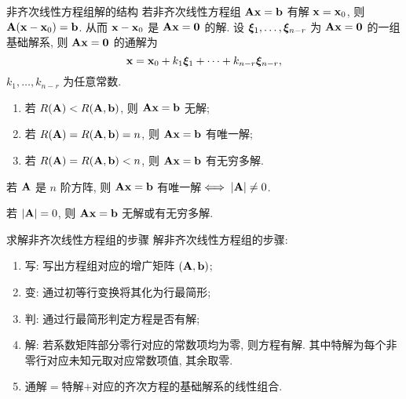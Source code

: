 \begin{frame}{非齐次线性方程组解的结构}
	\onslide<+->
	若非齐次线性方程组 ${\mathbf{A}}{\mathbf{x}}={\mathbf{b}}$ 有解 ${\mathbf{x}}={\mathbf{x}}_0$,
	则 ${\mathbf{A}}({\mathbf{x}}-{\mathbf{x}}_0)={\mathbf{b}}$.
	\onslide<+->
	从而 ${\mathbf{x}}-{\mathbf{x}}_0$ 是 ${\mathbf{A}}{\mathbf{x}}={\bf0}$ 的解.
	\onslide<+->
	设 ${\boldsymbol{\xi}}_1,\dots,{\boldsymbol{\xi}}_{n-r}$ 为 ${\mathbf{A}}{\mathbf{x}}={\bf0}$ 的一组基础解系, 则 ${\mathbf{A}}{\mathbf{x}}={\bf0}$ 的通解为
	\[{\mathbf{x}}={\mathbf{x}}_0+k_1{\boldsymbol{\xi}}_1+\cdots+k_{n-r}{\boldsymbol{\xi}}_{n-r},\]
	$k_1,\dots,k_{n-r}$ 为任意常数.

	\onslide<+->
	\begin{theorem}
		\begin{enumerate}
			\item 若 $R({\mathbf{A}})<R({\mathbf{A}},{\mathbf{b}})$, 则 ${\mathbf{A}} {\mathbf{x}}={\mathbf{b}}$ 无解;
			\item 若 $R({\mathbf{A}})=R({\mathbf{A}},{\mathbf{b}})=n$, 则 ${\mathbf{A}} {\mathbf{x}}={\mathbf{b}}$ 有唯一解;
			\item 若 $R({\mathbf{A}})=R({\mathbf{A}},{\mathbf{b}})<n$, 则 ${\mathbf{A}} {\mathbf{x}}={\mathbf{b}}$ 有无穷多解.
		\end{enumerate}
	\end{theorem}
	\onslide<+->
	\begin{corollary}
		若 ${\mathbf{A}}$ 是 $n$ 阶方阵, 则 ${\mathbf{A}}{\mathbf{x}}={\mathbf{b}}$ 有唯一解$\iff|{\mathbf{A}}|\neq0$.
	\end{corollary}
	\onslide<+->
	若 $|{\mathbf{A}}|=0$, 则 ${\mathbf{A}}{\mathbf{x}}={\mathbf{b}}$ 无解或有无穷多解.
\end{frame}


\begin{frame}{求解非齐次线性方程组的步骤}
	\onslide<+->
	解非齐次线性方程组的步骤:
	\begin{enumerate}
		\item 写: 写出方程组对应的增广矩阵 $({\mathbf{A}},{\mathbf{b}})$;
		\item 变: 通过初等行变换将其化为行最简形;
		\item 判: 通过行最简形判定方程是否有解;
		\item 解: 若系数矩阵部分零行对应的常数项均为零, 则方程有解.
		其中特解为每个非零行对应未知元取对应常数项值, 其余取零.
		\item 通解$=$特解$+$对应的齐次方程的基础解系的线性组合.
	\end{enumerate}
\end{frame}


